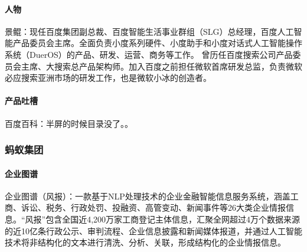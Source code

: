 \documentclass[letterpaper,11pt,english]{sphinxmanual}
\begin{document}
\paragraph{人物}
\label{\detokenize{chapter_company/baidu:id2}}
景鲲：现任百度集团副总裁、百度智能生活事业群组（SLG）总经理，百度人工智能产品委员会主席。全面负责小度系列硬件、小度助手和小度对话式人工智能操作系统（DuerOS）的产品、研发、运营、商务等工作。
曾历任百度搜索公司产品委员会主席、大搜索总产品架构师。加入百度之前担任微软首席研发总监，负责微软必应搜索亚洲市场的研发工作，也是微软小冰的创造者。%
\begin{footnote}[871]\sphinxAtStartFootnote
{}
%
\end{footnote}


\paragraph{产品吐槽}
\label{\detokenize{chapter_company/baidu:id3}}
百度百科：半屏的时候目录没了。。%
\begin{footnote}[872]\sphinxAtStartFootnote
{}
%
\end{footnote}


\subsubsection{蚂蚁集团}
\label{\detokenize{chapter_company/antgroup:id1}}\label{\detokenize{chapter_company/antgroup::doc}}

\paragraph{企业图谱}
\label{\detokenize{chapter_company/antgroup:id2}}
企业图谱（风报）：一款基于NLP处理技术的企业金融智能信息服务系统，涵盖工商、诉讼、税务、行政处罚、投融资、高管变动、新闻事件等26大类企业情报信息。“风报”包含全国近4,200万家工商登记主体信息，汇聚全网超过4万个数据来源的近10亿条行政公示、审判流程、企业信息披露和新闻媒体报道，并通过人工智能技术将非结构化的文本进行清洗、分析、关联，形成结构化的企业情报信息。%
\begin{footnote}[873]\sphinxAtStartFootnote
{}
%
\end{footnote}
\end{document}
